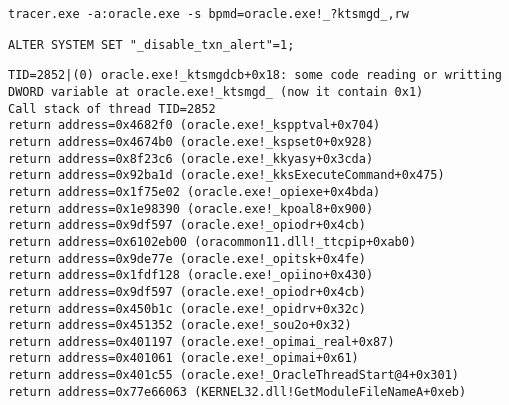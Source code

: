 
\begin{lstlisting}
tracer.exe -a:oracle.exe -s bpmd=oracle.exe!_?ktsmgd_,rw
\end{lstlisting}


\begin{lstlisting}
ALTER SYSTEM SET "_disable_txn_alert"=1;
\end{lstlisting}


\begin{lstlisting}
TID=2852|(0) oracle.exe!_ktsmgdcb+0x18: some code reading or writting DWORD variable at oracle.exe!_ktsmgd_ (now it contain 0x1)
Call stack of thread TID=2852
return address=0x4682f0 (oracle.exe!_kspptval+0x704)
return address=0x4674b0 (oracle.exe!_kspset0+0x928)
return address=0x8f23c6 (oracle.exe!_kkyasy+0x3cda)
return address=0x92ba1d (oracle.exe!_kksExecuteCommand+0x475)
return address=0x1f75e02 (oracle.exe!_opiexe+0x4bda)
return address=0x1e98390 (oracle.exe!_kpoal8+0x900)
return address=0x9df597 (oracle.exe!_opiodr+0x4cb)
return address=0x6102eb00 (oracommon11.dll!_ttcpip+0xab0)
return address=0x9de77e (oracle.exe!_opitsk+0x4fe)
return address=0x1fdf128 (oracle.exe!_opiino+0x430)
return address=0x9df597 (oracle.exe!_opiodr+0x4cb)
return address=0x450b1c (oracle.exe!_opidrv+0x32c)
return address=0x451352 (oracle.exe!_sou2o+0x32)
return address=0x401197 (oracle.exe!_opimai_real+0x87)
return address=0x401061 (oracle.exe!_opimai+0x61)
return address=0x401c55 (oracle.exe!_OracleThreadStart@4+0x301)
return address=0x77e66063 (KERNEL32.dll!GetModuleFileNameA+0xeb)
\end{lstlisting}


